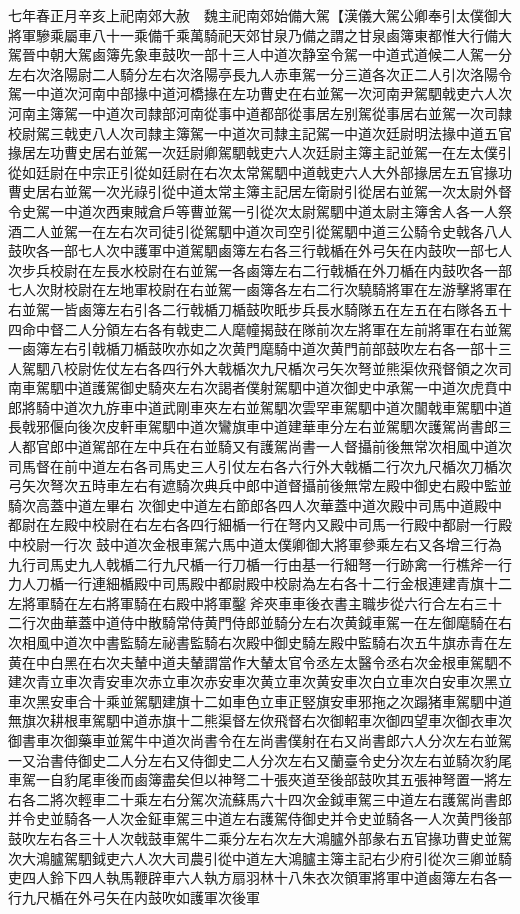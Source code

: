 七年春正月辛亥上祀南郊大赦　魏主祀南郊始備大駕【漢儀大駕公卿奉引太僕御大將軍驂乘屬車八十一乘備千乘萬騎祀天郊甘泉乃備之謂之甘泉鹵簿東都惟大行備大駕晉中朝大駕鹵簿先象車鼓吹一部十三人中道次静室令駕一中道式道候二人駕一分左右次洛陽尉二人騎分左右次洛陽亭長九人赤車駕一分三道各次正二人引次洛陽令駕一中道次河南中部掾中道河橋掾在左功曹史在右並駕一次河南尹駕駟戟吏六人次河南主簿駕一中道次司隸部河南從事中道都部從事居左别駕從事居右並駕一次司隸校尉駕三戟吏八人次司隸主簿駕一中道次司隸主記駕一中道次廷尉明法掾中道五官掾居左功曹史居右並駕一次廷尉卿駕駟戟吏六人次廷尉主簿主記並駕一在左太僕引從如廷尉在中宗正引從如廷尉在右次太常駕駟中道戟吏六人大外部掾居左五官掾功曹史居右並駕一次光祿引從中道太常主簿主記居左衛尉引從居右並駕一次太尉外督令史駕一中道次西東賊倉戶等曹並駕一引從次太尉駕駟中道太尉主簿舍人各一人祭酒二人並駕一在左右次司徒引從駕駟中道次司空引從駕駟中道三公騎令史戟各八人鼓吹各一部七人次中護軍中道駕駟鹵簿左右各三行戟楯在外弓矢在内鼓吹一部七人次步兵校尉在左長水校尉在右並駕一各鹵簿左右二行戟楯在外刀楯在内鼓吹各一部七人次財校尉在左地軍校尉在右並駕一鹵簿各左右二行次驍騎將軍在左游擊將軍在右並駕一皆鹵簿左右引各二行戟楯刀楯鼓吹眂步兵長水騎隊五在左五在右隊各五十四命中督二人分領左右各有戟吏二人麾幢揭鼓在隊前次左將軍在左前將軍在右並駕一鹵簿左右引戟楯刀楯鼓吹亦如之次黄門麾騎中道次黄門前部鼓吹左右各一部十三人駕駟八校尉佐仗左右各四行外大戟楯次九尺楯次弓矢次弩並熊渠佽飛督領之次司南車駕駟中道護駕御史騎夾左右次謁者僕射駕駟中道次御史中承駕一中道次虎賁中郎將騎中道次九斿車中道武剛車夾左右並駕駟次雲罕車駕駟中道次闟戟車駕駟中道長戟邪偃向後次皮軒車駕駟中道次鸞旗車中道建華車分左右並駕駟次護駕尚書郎三人都官郎中道駕部在左中兵在右並騎又有護駕尚書一人督攝前後無常次相風中道次司馬督在前中道左右各司馬史三人引仗左右各六行外大戟楯二行次九尺楯次刀楯次弓矢次弩次五時車左右有遮騎次典兵中郎中道督攝前後無常左殿中御史右殿中監並騎次高蓋中道左畢右次御史中道左右節郎各四人次華蓋中道次殿中司馬中道殿中都尉在左殿中校尉在右左右各四行細楯一行在弩内又殿中司馬一行殿中都尉一行殿中校尉一行次鼓中道次金根車駕六馬中道太僕卿御大將軍參乘左右又各增三行為九行司馬史九人戟楯二行九尺楯一行刀楯一行由基一行細弩一行跡禽一行樵斧一行力人刀楯一行連細楯殿中司馬殿中都尉殿中校尉為左右各十二行金根連建青旗十二左將軍騎在左右將軍騎在右殿中將軍鑿斧夾車車後衣書主職步從六行合左右三十二行次曲華蓋中道侍中散騎常侍黄門侍郎並騎分左右次黄鉞車駕一在左御麾騎在右次相風中道次中書監騎左祕書監騎右次殿中御史騎左殿中監騎右次五牛旗赤青在左黄在中白黑在右次夫輦中道夫輦謂當作大輦太官令丞左太醫令丞右次金根車駕駟不建次青立車次青安車次赤立車次赤安車次黄立車次黄安車次白立車次白安車次黑立車次黑安車合十乘並駕駟建旗十二如車色立車正竪旗安車邪拖之次蹋猪車駕駟中道無旗次耕根車駕駟中道赤旗十二熊渠督左佽飛督右次御軺車次御四望車次御衣車次御書車次御藥車並駕牛中道次尚書令在左尚書僕射在右又尚書郎六人分次左右並駕一又治書侍御史二人分左右又侍御史二人分次左右又蘭臺令史分次左右並騎次豹尾車駕一自豹尾車後而鹵簿盡矣但以神弩二十張夾道至後部鼓吹其五張神弩置一將左右各二將次輕車二十乘左右分駕次流蘇馬六十四次金鉞車駕三中道左右護駕尚書郎并令史並騎各一人次金鉦車駕三中道左右護駕侍御史并令史並騎各一人次黄門後部鼓吹左右各三十人次戟鼓車駕牛二乘分左右次左大鴻臚外部彖右五官掾功曹史並駕次大鴻臚駕駟鉞吏六人次大司農引從中道左大鴻臚主簿主記右少府引從次三卿並騎吏四人鈴下四人執馬鞭辟車六人執方扇羽林十八朱衣次領軍將軍中道鹵簿左右各一行九尺楯在外弓矢在内鼓吹如護軍次後軍